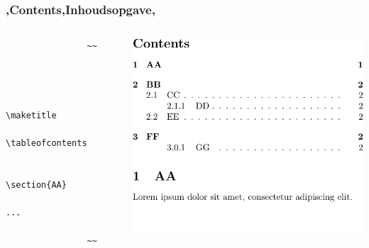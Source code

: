 
\begin{frame}[fragile]
    \frametitle{\lang,Contents,Inhoudsopgave,}
    
    \begin{columns}
        \begin{column}{0.5\textwidth}
            \begin{verbatim}
                ~~


                
                    \maketitle
                    \tableofcontents
        
                    \section{AA}
                    ...
                
                ~~
            \end{verbatim}
        \end{column}
        \begin{column}{0.5\textwidth}
            \includegraphics[width=\linewidth,height=0.8\textheight,keepaspectratio,page=1]{assets/tableofcontents.pdf}
        \end{column}
    \end{columns}
\end{frame}

